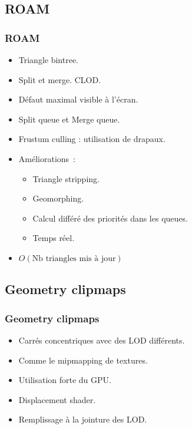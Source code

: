 \documentclass{beamer}
\begin{document}
\subsection{ROAM}
\begin{frame}
  \frametitle{ROAM}
  \begin{itemize}
  \item Triangle bintree.
  \item Split et merge. CLOD.
  \item Défaut maximal visible à l'écran.
  \item Split queue et Merge queue.
  \item Frustum culling : utilisation de drapaux.
  \item Améliorations~:
    \begin{itemize}
    \item Triangle stripping.
    \item Geomorphing.
    \item Calcul différé des priorités dans les queues.
    \item Temps réel.
    \end{itemize}
  \item $O(\text{Nb triangles mis à jour})$
  \end{itemize}
\end{frame}

\subsection{Geometry clipmaps}
\begin{frame}
  \frametitle{Geometry clipmaps}
  \begin{itemize}
  \item Carrés concentriques avec des LOD différents.
  \item Comme le mipmapping de textures.
  \item Utilisation forte du GPU.
  \item Displacement shader.
  \item Remplissage à la jointure des LOD.
  \end{itemize}
\end{frame}
\end{document}
